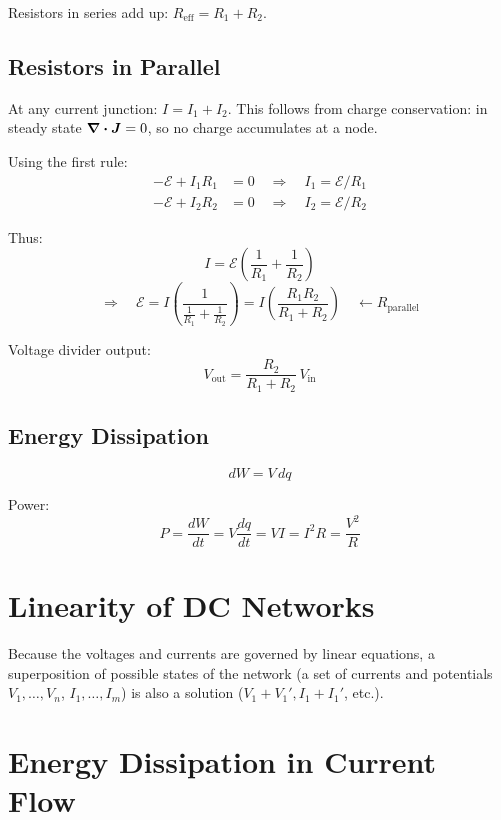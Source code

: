 Resistors in series add up: $R_\text{eff} = R_1 + R_2$.

\subsection{Resistors in Parallel}

\begin{theorem}
At any current junction: $I = I_1 + I_2$. This follows from charge conservation: in steady state $\div\vect{J}=0$, so no charge accumulates at a node.
\end{theorem}

Using the first rule:
\begin{align*}
    -\mathcal{E} + I_1 R_1 &= 0 \quad\Rightarrow\quad I_1 = \mathcal{E}/R_1 \\
    -\mathcal{E} + I_2 R_2 &= 0 \quad\Rightarrow\quad I_2 = \mathcal{E}/R_2
\end{align*}

Thus:
\[
    I = \mathcal{E}\!\left(\frac{1}{R_1} + \frac{1}{R_2}\right)
\]
\[
    \Rightarrow \quad \mathcal{E} = I\!\left(\frac{1}{\frac{1}{R_1}+\frac{1}{R_2}}\right)
    = I\!\left(\frac{R_1 R_2}{R_1+R_2}\right) \quad \leftarrow R_\text{parallel}
\]

Voltage divider output:
\[
    V_\text{out} = \frac{R_2}{R_1+R_2}\,V_\text{in}
\]

\subsection{Energy Dissipation}

\[
    dW = V\,dq
\]

Power:
\[
    P = \frac{dW}{dt} = V\frac{dq}{dt} = VI = \boxed{I^2 R} = \frac{V^2}{R}
\]

\section{Linearity of DC Networks}

\begin{fact}
Because the voltages and currents are governed by linear equations, a superposition of possible states of the network (a set of currents and potentials $V_1,\ldots,V_n$, $I_1,\ldots,I_m$) is also a solution ($V_1+V_1', I_1+I_1'$, etc.).
\end{fact}

\section{Energy Dissipation in Current Flow}

